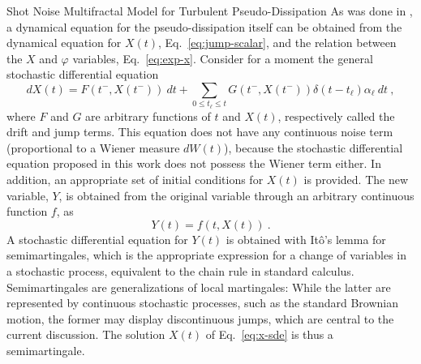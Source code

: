 \begin{chapter}{Shot Noise Multifractal Model for Turbulent Pseudo-Dissipation}
As was done in \textcite{schmitt2003,pereira2018multifractal}, a dynamical equation for the pseudo-dissipation itself can be obtained from the dynamical equation for $X(t)$, Eq.~\eqref{eq:jump-scalar}, and the relation between the $X$ and $\varphi$ variables, Eq.~\eqref{eq:exp-x}.
Consider for a moment the general stochastic differential equation
\begin{equation} \label{eq:x-sde}
    dX(t) = F(t^-, X(t^-)) \ dt + \sum_{0 \leq t_{\ell} \leq t} G(t^-,X(t^-)) \delta(t-t_{\ell}) \alpha_{\ell} \ dt \ ,
\end{equation}
where $F$ and $G$ are arbitrary functions of $t$ and $X(t)$, respectively called the drift and jump terms. This equation does not have any continuous noise term (proportional to a Wiener measure $dW(t)$), because the stochastic differential equation proposed in this work does not possess the Wiener term either.
In addition, an appropriate set of initial conditions for $X(t)$ is provided.
The new variable, $Y$, is obtained from the original variable through an arbitrary continuous function $f$, as
\begin{equation} \label{eq:f}
    Y(t) = f(t,X(t)) \ .
\end{equation}
A stochastic differential equation for $Y(t)$ is obtained \parencite{protter2005,klebaner2012} with It\^{o}'s lemma for semimartingales, which is the appropriate expression for a change of variables in a stochastic process, equivalent to the chain rule in standard calculus. Semimartingales are generalizations of local martingales: While the latter are represented by continuous stochastic processes, such as the standard Brownian motion, the former may display discontinuous jumps, which are central to the current discussion. The solution $X(t)$ of Eq.~\eqref{eq:x-sde} is thus a semimartingale.


\end{chapter}
